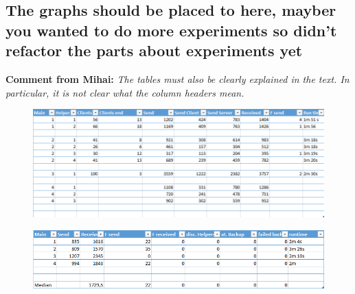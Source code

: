 \subsection{The graphs should be placed to here, mayber you wanted to do more experiments so didn't refactor the parts about experiments yet}
\textbf{Comment from Mihai:} \textit{The tables must
also be clearly explained in the text. In particular, it is not clear
what the column headers mean.}
\begin{figure}[ht]
\includegraphics[scale=0.5]{M1.png}
\end{figure}

\begin{figure}[ht]
\includegraphics[scale=0.5]{M2.png}
\end{figure}